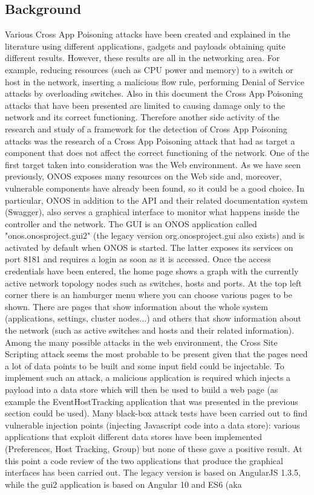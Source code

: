 \subsection{Background}

Various Cross App Poisoning attacks have been created and explained in the literature using different applications, gadgets and payloads obtaining quite different results. However, these results are all in the networking area. For example, reducing resources (such as CPU power and memory) to a switch or host in the network, inserting a malicious flow rule, performing Denial of Service attacks by overloading switches. Also in this document the Cross App Poisoning attacks that have been presented are limited to causing damage only to the network and its correct functioning. Therefore another side activity of the research and study of a framework for the detection of Cross App Poisoning attacks was the research of a Cross App Poisoning attack that had as target a component that does not affect the correct functioning of the network. One of the first target taken into consideration was the Web environment. As we have seen previously, ONOS exposes many resources on the Web side and, moreover, vulnerable components have already been found, so it could be a good choice. In particular, ONOS in addition to the API and their related documentation system (Swagger), also serves a graphical interface to monitor what happens inside the controller and the network. The GUI is an ONOS application called "onos.onosproject.gui2" (the legacy version org.onosproject.gui also exists) and is activated by default when ONOS is started. The latter exposes its services on port 8181 and requires a login as soon as it is accessed. Once the access credentials have been entered, the home page shows a graph with the currently active network topology nodes such as switches, hosts and ports. At the top left corner there is an hamburger menu where you can choose various pages to be shown. There are pages that show information about the whole system (applications, settings, cluster nodes...) and others that show information about the network (such as active switches and hosts and their related information). Among the many possible attacks in the web environment, the Cross Site Scripting attack seems the most probable to be present given that the pages need a lot of data points to be built and some input field could be injectable. To implement such an attack, a malicious application is required which injects a payload into a data store which will then be used to build a web page (as example the EventHostTracking application that was presented in the previous section could be used). Many black-box attack tests have been carried out to find vulnerable injection points (injecting Javascript code into a data store): various applications that exploit different data stores have been implemented (Preferences, Host Tracking, Group) but none of these gave a positive result. At this point a code review of the two applications that produce the graphical interfaces has been carried out. The legacy version is based on AngularJS 1.3.5, while the gui2 application is based on Angular 10 and ES6 (aka 
